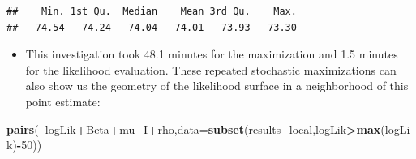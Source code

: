 \documentclass[]{article}
\newenvironment{Shaded}{\begin{snugshade}}{\end{snugshade}}
\newcommand{\KeywordTok}[1]{\textcolor[rgb]{0.13,0.29,0.53}{\textbf{#1}}}
\newcommand{\DataTypeTok}[1]{\textcolor[rgb]{0.13,0.29,0.53}{#1}}
\newcommand{\DecValTok}[1]{\textcolor[rgb]{0.00,0.00,0.81}{#1}}
\newcommand{\StringTok}[1]{\textcolor[rgb]{0.31,0.60,0.02}{#1}}
\newcommand{\OtherTok}[1]{\textcolor[rgb]{0.56,0.35,0.01}{#1}}
\newcommand{\OperatorTok}[1]{\textcolor[rgb]{0.81,0.36,0.00}{\textbf{#1}}}
\newcommand{\NormalTok}[1]{#1}
\providecommand{\tightlist}{%
  \setlength{\itemsep}{0pt}\setlength{\parskip}{0pt}}
\begin{document}
\begin{Shaded}
\end{Shaded}

\begin{verbatim}
##    Min. 1st Qu.  Median    Mean 3rd Qu.    Max. 
##  -74.54  -74.24  -74.04  -74.01  -73.93  -73.30
\end{verbatim}

\begin{itemize}
\tightlist
\item
  This investigation took 48.1 minutes for the maximization and 1.5
  minutes for the likelihood evaluation. These repeated stochastic
  maximizations can also show us the geometry of the likelihood surface
  in a neighborhood of this point estimate:
\end{itemize}

\begin{Shaded}
\begin{Highlighting}[]
\KeywordTok{pairs}\NormalTok{(}\OperatorTok{~}\NormalTok{logLik}\OperatorTok{+}\NormalTok{Beta}\OperatorTok{+}\NormalTok{mu_I}\OperatorTok{+}\NormalTok{rho,}\DataTypeTok{data=}\KeywordTok{subset}\NormalTok{(results_local,logLik}\OperatorTok{>}\KeywordTok{max}\NormalTok{(logLik)}\OperatorTok{-}\DecValTok{50}\NormalTok{))}
\end{Highlighting}
\end{Shaded}
\end{document}
